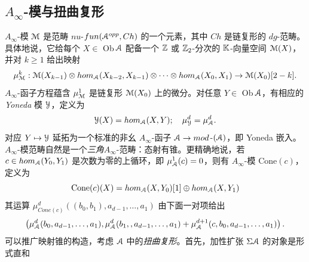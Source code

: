 \subsection{$A_{\infty}$-模与扭曲复形}

$A_{\infty}$-模 $\EuScript{M}$ 是范畴 $nu$-$fun(\EuScript{A}^{opp},Ch)$ 的一个元素，其中 $Ch$ 是链复形的 $dg$-范畴。具体地说，它给每个 $X\in$ Ob$\,\EuScript{A}$ 配备一个 $\mathbb{Z}$ 或 $\mathbb{Z}_2$-分次的 $\mathbb{K}$-向量空间 $\EuScript{M}(X)$，并对 $k\geq 1$ 给出映射
\[
\mu_{\EuScript{M}}^k: \EuScript{M}(X_{k-1}) \otimes hom_{\EuScript{A}}(X_{k-2},X_{k-1}) \otimes \cdots \otimes hom_{\EuScript{A}}(X_0,X_1) \rightarrow \EuScript{M}(X_0)[2-k].
\]
$A_{\infty}$-函子方程蕴含 $\mu_{\EuScript{M}}^1$ 是链复形 $\EuScript{M}(X_0)$ 上的微分。对任意 $Y \in$ Ob$\,\EuScript{A}$，有相应的 \emph{Yoneda} 模 $\EuScript{Y}$，定义为
\[
\EuScript{Y}(X) = hom_{\EuScript{A}}(X,Y); \quad \mu_{\EuScript{Y}}^d = \mu_{\EuScript{A}}^d.
\]
对应 $Y \mapsto \EuScript{Y}$ 延拓为一个标准的非幺 $A_{\infty}$-函子 $\EuScript{A} \rightarrow mod$-$(\EuScript{A})$，即 Yoneda 嵌入。$A_{\infty}$-模范畴自然是一个\emph{三角}$A_{\infty}$-范畴：态射有锥。更精确地说，若 $c\in hom_{\EuScript{A}}(Y_0,Y_1)$ 是次数为零的上循环，即 $\mu^1_{\EuScript{A}}(c)=0$，则有 $A_{\infty}$-模 Cone$(c)$，定义为
\begin{equation}\label{eqn:cone}
\mathrm{Cone}(c)(X) = hom_{\EuScript{A}}(X,Y_0)[1] \oplus hom_{\EuScript{A}}(X,Y_1)
\end{equation}
其运算 $\mu^d_{Cone(c)}((b_0,b_1),a_{d-1},\ldots,a_1)$ 由下面一对项给出
\[
\left(\mu_{\EuScript{A}}^d(b_0,a_{d-1},\ldots,a_1), \mu_{\EuScript{A}}^d(b_1,,a_{d-1},\ldots,a_1)+ \mu_{\EuScript{A}}^{d+1}(c,b_0,a_{d-1},\ldots,a_1) \right).
\]
可以推广映射锥的构造，考虑 $\EuScript{A}$ 中的\emph{扭曲复形}。首先，加性扩张 $\Sigma\EuScript{A}$ 的对象是形式直和

